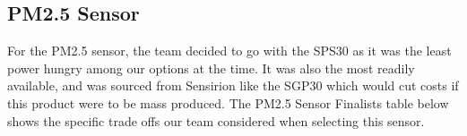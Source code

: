 \subsection{PM2.5 Sensor}
For the PM2.5 sensor, the team decided to go with the SPS30 as it was the least power hungry among our options at the time. It was also the most readily available, and was sourced from Sensirion like the SGP30 which would cut costs if this product were to be mass produced. The PM2.5 Sensor Finalists table below shows the specific trade offs our team considered when selecting this sensor.\\
\\
\begin{table}[h]
\centering
{}
\caption{PM2.5 Sensor Finalists}
\label{tab:PM2.5 Sensor Finalists}
\end{table}
